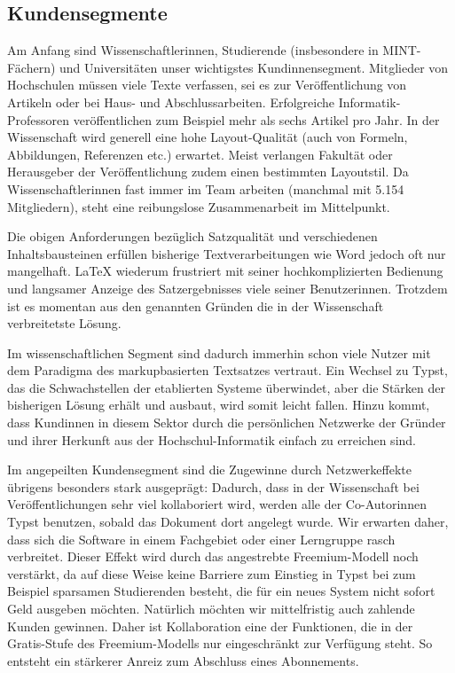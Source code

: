 \documentclass[11pt, a4paper]{article}
\newcommand{\gender}{\raisebox{-.25em}{*}}
\renewcommand{\glossary} {\marginsymbol{$\hookrightarrow$}}
\newcommand{\cited}[1]{\marginsymbol{$\nearrow$ #1}}
\newcommand{\marginsymbol}[1] {\protect\marginsymbolhelper{#1}}
\newcommand{\marginsymbolhelper}[1] {\tabto*{-1cm}\makebox[0cm]{#1}\tabto*{\TabPrevPos}}
\begin{document}
\subsection*{Kundensegmente}

Am Anfang sind Wissenschaftler\gender{}innen, Studierende (insbesondere in MINT-Fächern) und Universitäten unser wichtigstes Kund\gender{}innensegment. Mitglieder von Hochschulen müssen viele Texte verfassen, sei es zur Veröffentlichung von Artikeln oder bei Haus- und Abschlussarbeiten. \cited{4} Erfolgreiche Informatik-Professoren veröffentlichen zum Beispiel mehr als sechs Artikel pro Jahr. In der Wissenschaft wird generell eine hohe Layout-Qualität (auch von Formeln, Abbildungen, Referenzen etc.) erwartet. Meist verlangen Fakultät oder Herausgeber der Veröffentlichung zudem einen bestimmten Layoutstil. Da Wissenschaftler\gender{}innen fast immer im Team arbeiten (manchmal mit 5.154 Mitgliedern\cited{5}), steht eine reibungslose Zusammenarbeit im Mittelpunkt.

Die obigen Anforderungen bezüglich Satzqualität und verschiedenen Inhaltsbausteinen erfüllen bisherige Textverarbeitungen wie Word jedoch oft nur mangelhaft. LaTeX wiederum \cited{6}frustriert mit seiner hochkomplizierten Bedienung und langsamer Anzeige des Satzergebnisses viele seiner Benutzer\gender{}innen. Trotzdem ist es momentan aus den genannten Gründen die in der Wissenschaft verbreitetste Lösung.

Im wissenschaftlichen Segment sind dadurch immerhin schon viele Nutzer mit dem Paradigma des markupbasierten Textsatzes vertraut. Ein Wechsel zu Typst, das die Schwachstellen der etablierten Systeme überwindet, aber die Stärken der bisherigen Lösung erhält und ausbaut, wird somit leicht fallen. Hinzu kommt, dass Kund\gender{}innen in diesem Sektor durch die persönlichen Netzwerke der Gründer und ihrer Herkunft aus der Hochschul-Informatik einfach zu erreichen sind.


Im angepeilten Kundensegment sind die Zugewinne durch \glossary Netzwerkeffekte übrigens besonders stark ausgeprägt: Dadurch, dass in der Wissenschaft bei Veröffentlichungen sehr viel kollaboriert wird, werden alle der Co-Autor\gender{}innen Typst benutzen, sobald das Dokument dort angelegt wurde. Wir erwarten daher, dass sich die Software in einem Fachgebiet oder einer Lerngruppe rasch verbreitet. Dieser Effekt wird durch das angestrebte \glossary Freemium-Modell noch verstärkt, da auf diese Weise keine Barriere zum Einstieg in Typst bei zum Beispiel sparsamen Studierenden besteht, die für ein neues System nicht sofort Geld ausgeben möchten. Natürlich möchten wir mittelfristig auch zahlende Kunden gewinnen. Daher ist Kollaboration eine der Funktionen, die in der Gratis-Stufe des Freemium-Modells nur eingeschränkt zur Verfügung steht. So entsteht ein stärkerer Anreiz zum Abschluss eines Abonnements.
\end{document}
